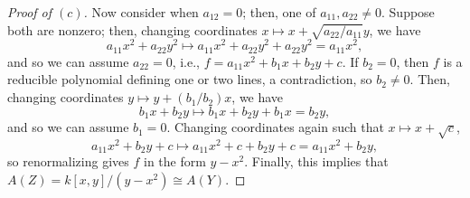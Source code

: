 \documentclass[12pt,letterpaper]{article}
\theoremstyle{definition}
\theoremstyle{remark}
\numberwithin{equation}{section}
\numberwithin{figure}{problem}
\begin{document}
\begin{proof}[Proof of $(c)$]
  \par Now consider when $a_{12} = 0$; then, one of $a_{11},a_{22} \ne 0$. Suppose both are nonzero; then, changing coordinates $x \mapsto x + \sqrt{a_{22}/a_{11}}y$, we have
  \begin{equation*}
    a_{11}x^2 + a_{22}y^2 \mapsto a_{11}x^2 + a_{22}y^2 + a_{22}y^2 = a_{11}x^2,
  \end{equation*}
  and so we can assume $a_{22} = 0$, i.e., $f = a_{11}x^2 + b_1x + b_2y + c$. If $b_2 = 0$, then $f$ is a reducible polynomial defining one or two lines, a contradiction, so $b_2 \ne 0$. Then, changing coordinates $y \mapsto y + (b_1/b_2)x$, we have
  \begin{equation*}
    b_1x + b_2y \mapsto b_1x + b_2y + b_1x = b_2y,
  \end{equation*}
  and so we can assume $b_1 = 0$. Changing coordinates again such that $x \mapsto x + \sqrt{c}$,
  \begin{equation*}
    a_{11}x^2 + b_2y + c \mapsto a_{11}x^2 + c + b_2y + c = a_{11}x^2 + b_2y,
  \end{equation*}
  so renormalizing gives $f$ in the form $y - x^2$. Finally, this implies that $A(Z) = k[x,y]/(y-x^2) \cong A(Y)$.
\end{proof}
\end{document}
